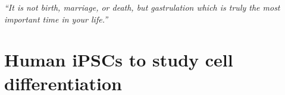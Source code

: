 
 







\newpage

\vspace*{10px}

\textit{“It is not birth, marriage, or death, but gastrulation which is truly the most important time in your life.”}\\

\vspace*{5px}


\section{Human iPSCs to study cell differentiation}  %
\label{sec:human_ipscs}  

